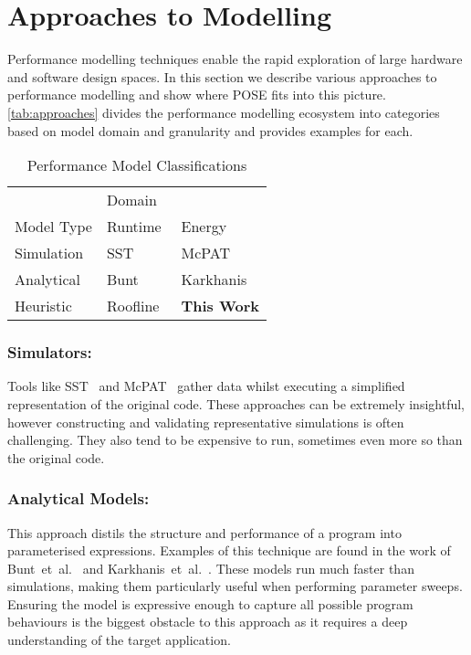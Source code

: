 \section{Approaches to Modelling}
\label{sec:approaches}
Performance modelling techniques enable the rapid exploration of large hardware and software design spaces.
In this section we describe various approaches to performance modelling and show where POSE fits into this picture.
\autoref{tab:approaches} divides the performance modelling ecosystem into categories based on model domain and granularity and provides examples for each.

\begin{table}
  \centering
  \caption{Performance Model Classifications}
  \setlength{\tabcolsep}{10pt}
  \begin{tabular}{lll}
  \toprule
    & \multicolumn{2}{l}{Domain}\\ \cmidrule(){2-3}
  Model Type  & Runtime & Energy \\
    \midrule
  Simulation & SST~\cite{rodrigues:2011aa} & McPAT~\cite{li:2009aa}  \\
  Analytical & Bunt~\cite{bunt:2013aa} & Karkhanis~\cite{karkhanis:2007aa} \\
  Heuristic & Roofline~\cite{williams:2009aa} & \textbf{This Work} \\
  \bottomrule
  \end{tabular}
  \label{tab:approaches}
\end{table}

\subsubsection{Simulators:} 
Tools like SST~\cite{rodrigues:2011aa} and McPAT~\cite{li:2009aa} gather data whilst executing a simplified representation of the original code.
These approaches can be extremely insightful, however constructing and validating representative simulations is often challenging.
They also tend to be expensive to run, sometimes even more so than the original code.

\subsubsection{Analytical Models:} This approach distils the structure and performance of a program into parameterised expressions.
Examples of this technique are found in the work of Bunt~et~al.~\cite{bunt:2013aa} and Karkhanis~et~al.~\cite{karkhanis:2007aa}.
These models run much faster than simulations, making them particularly useful when performing parameter sweeps.
Ensuring the model is expressive enough to capture all possible program behaviours is the biggest obstacle to this approach as it requires a deep understanding of the target application.

